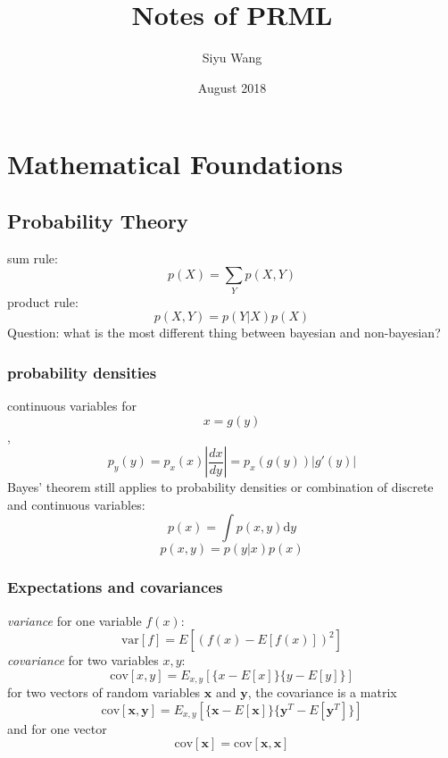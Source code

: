 \documentclass[a4paper]{book}
\title{Notes of PRML}
\author{Siyu Wang}
\date{August 2018}
\begin{document}
\maketitle

\chapter{Mathematical Foundations}
\section{Probability Theory}
sum rule: $$p(X) = \sum_Yp(X,Y)$$
product rule: $$p(X,Y) = p(Y|X)p(X)$$
Question: what is the most different thing between bayesian and non-bayesian?
\subsection{probability densities}
continuous variables for $$x = g(y)$$ , $$p_y(y) = p_x(x)|\frac{dx}{dy}| = p_x(g(y))|g'(y)|$$
Bayes' theorem still applies to probability densities or combination of discrete and continuous variables:
$$p(x) = \int p(x, y)\mathrm{d}y$$
$$p(x,y) = p(y|x)p(x)$$
\subsection{Expectations and covariances}
\textit{variance} for one variable $f(x)$: $$\mathrm{var}[f] = E[(f(x)-E[f(x)])^2]$$
\emph{covariance} for two variables $x, y$: $$\mathrm{cov}[x,y]= E_{x,y}[\{x-E[x]\}\{y-E[y]\}]$$
for two vectors of random variables $\textbf{x}$ and $\textbf{y}$, the covariance is a matrix
$$\mathrm{cov}[\textbf{x}, \textbf{y}] =E_{x,y}[\{\textbf{x}-E[\textbf{x} ]\}\{\textbf {y}^T-E[\textbf {y}^T]\}]$$
and for one vector $$\mathrm{cov}[\textbf{x}] = \mathrm{cov}[\textbf {x},\textbf {x}]$$
\end{document}
